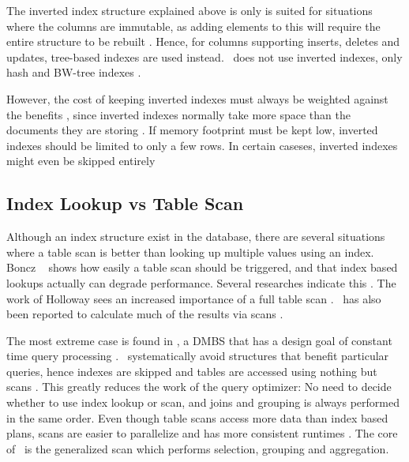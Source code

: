 The inverted index structure explained above is only is suited for situations where the columns are immutable, as adding elements to this will require the entire structure to be rebuilt \cite{Schwalb2014-hn}. Hence, for columns supporting inserts, deletes and updates, tree-based indexes are used instead. \mssql~does not use inverted indexes, only hash and BW-tree indexes \cite{Delaney2014-ip, noauthor_undated-vq}.

However, the cost of keeping inverted indexes must always be weighted against the benefits \cite{Lemke2010-is}, since inverted indexes normally take more space than the documents they are storing \cite{Moffat1992-tz}. If memory footprint must be kept low, inverted indexes should be limited to only a few rows. In certain caseses, inverted indexes might even be skipped entirely

\subsection{Index Lookup vs Table Scan}
\label{sub:Index Lookup vs Table Scan}
Although an index structure exist in the database, there are several situations where a table scan is better than looking up multiple values using an index. Boncz \ea~\cite{Boncz2006-md} shows how easily a table scan should be triggered, and that index based lookups actually can degrade performance. Several researches indicate this \cite{Boncz2002-yj, Abadi2008-dd}. The work of Holloway \ea sees an increased importance of a full table scan \cite{Holloway2008-rr}. \qlikview~has also been reported to calculate much of the results via scans \cite{noauthor_undated-js}.  

The most extreme case is found in \blink, a DMBS that has a design goal of constant time query processing \cite{Raman2008-gi}. \blink~systematically avoid structures that benefit particular queries, hence indexes are skipped and tables are accessed using nothing but scans \cite{Barber2012-xt}. This greatly reduces the work of the query optimizer: No need to decide whether to use index lookup or scan, and joins and grouping is always performed in the same order. Even though table scans access more data than index based plans, scans are easier to parallelize and has more consistent runtimes \cite{Raman2008-gi}. The core of \blink~is the generalized scan which performs selection, grouping and aggregation. 

